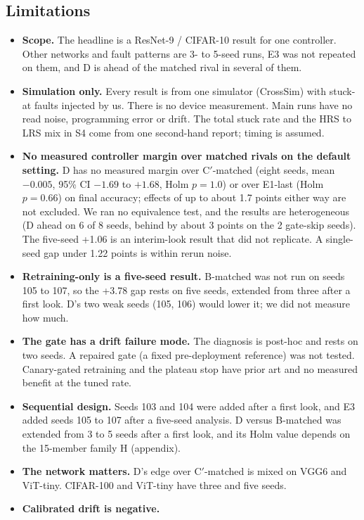 \documentclass[journal]{IEEEtran}
\begin{document}
\subsection{Limitations}
\begin{itemize}
\item \textbf{Scope.}
The headline is a ResNet-9 / CIFAR-10 result for one controller.
Other networks and fault patterns are 3- to 5-seed runs, E3 was not repeated on them, and D is ahead of the matched rival in several of them.
\item \textbf{Simulation only.}
Every result is from one simulator (CrossSim) with stuck-at faults injected by us.
There is no device measurement.
Main runs have no read noise, programming error or drift.
The total stuck rate and the HRS to LRS mix in S4 come from one second-hand report; timing is assumed.
\item \textbf{No measured controller margin over matched rivals on the default setting.}
D has no measured margin over C$'$-matched (eight seeds, mean $-0.005$, 95\% CI $-1.69$ to $+1.68$, Holm $p=1.0$) or over E1-last (Holm $p=0.66$) on final accuracy; effects of up to about 1.7 points either way are not excluded.
We ran no equivalence test, and the results are heterogeneous (D ahead on 6 of 8 seeds, behind by about 3 points on the 2 gate-skip seeds).
The five-seed +1.06 is an interim-look result that did not replicate.
A single-seed gap under 1.22 points is within rerun noise.
\item \textbf{Retraining-only is a five-seed result.}
B-matched was not run on seeds 105 to 107, so the +3.78 gap rests on five seeds, extended from three after a first look.
D's two weak seeds (105, 106) would lower it; we did not measure how much.
\item \textbf{The gate has a drift failure mode.}
The diagnosis is post-hoc and rests on two seeds.
A repaired gate (a fixed pre-deployment reference) was not tested.
Canary-gated retraining and the plateau stop have prior art and no measured benefit at the tuned rate.
\item \textbf{Sequential design.}
Seeds 103 and 104 were added after a first look, and E3 added seeds 105 to 107 after a five-seed analysis.
D versus B-matched was extended from 3 to 5 seeds after a first look, and its Holm value depends on the 15-member family H (appendix).
\item \textbf{The network matters.}
D's edge over C$'$-matched is mixed on VGG6 and ViT-tiny.
CIFAR-100 and ViT-tiny have three and five seeds.
\item \textbf{Calibrated drift is negative.}

\end{itemize}
\end{document}
